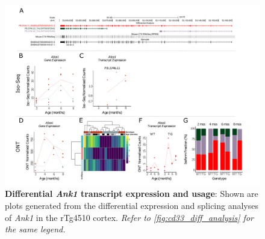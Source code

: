 \begin{landscape}
	\begin{figure}[htp]
		\begin{center}
			\includegraphics[page=3,trim={0 0.5cm 0 1.5cm},scale =0.85]{Figures/TargetGene_DifferentialAnalysis.pdf}
		\end{center}
		\captionsetup{width=1.5\textwidth}
		\caption[Differential \textit{Ank1} transcript expression and usage]%
		{\textbf{Differential \textit{Ank1} transcript expression and usage}: Shown are plots generated from the differential expression and splicing analyses of \textit{Ank1} in the rTg4510 cortex. \textit{Refer to \cref{fig:cd33_diff_analysis} for the same legend.}}   
		\label{fig:Ank1_diff_analysis}
	\end{figure}
\end{landscape}

